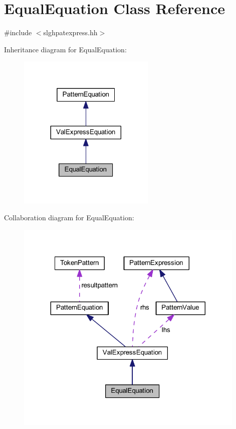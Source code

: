 \hypertarget{class_equal_equation}{}\section{Equal\+Equation Class Reference}
\label{class_equal_equation}


{\ttfamily \#include $<$slghpatexpress.\+hh$>$}



Inheritance diagram for Equal\+Equation\+:
\nopagebreak
\begin{figure}[H]
\begin{center}
\leavevmode
\includegraphics[width=185pt]{class_equal_equation__inherit__graph}
\end{center}
\end{figure}


Collaboration diagram for Equal\+Equation\+:
\nopagebreak
\begin{figure}[H]
\begin{center}
\leavevmode
\includegraphics[width=311pt]{class_equal_equation__coll__graph}
\end{center}
\end{figure}
